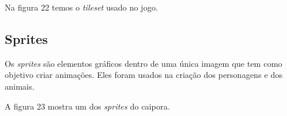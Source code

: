 Na figura 22 temos o \textit{tileset} usado no jogo.
\begin{figure}[h!]
		\centering
	\end{figure}

\subsection{Sprites}
Os \textit{sprites} são elementos gráficos dentro de uma única imagem que tem como objetivo criar animações. Eles foram usados na criação dos personagens e dos animais.

A figura 23 mostra um dos \textit{sprites} do caipora.

\begin{figure}[h!]
		\centering
	\end{figure}


